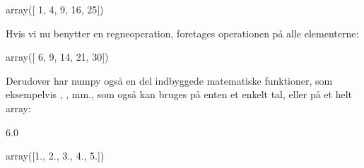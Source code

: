 \documentclass[letterpaper,10pt,english]{jupyterBook}
\begin{document}
\begin{sphinxVerbatim}[commandchars=\\\{\}]
  \PYG{p}{[}    \PYG{p}{]}
\end{sphinxVerbatim}

\begin{sphinxVerbatim}[commandchars=\\\{\}]
array([ 1,  4,  9, 16, 25])
\end{sphinxVerbatim}

Hvis vi nu benytter en regneoperation, foretages operationen på alle elementerne:

\begin{sphinxVerbatim}[commandchars=\\\{\}]
   
\end{sphinxVerbatim}

\begin{sphinxVerbatim}[commandchars=\\\{\}]
array([ 6,  9, 14, 21, 30])
\end{sphinxVerbatim}

Derudover har numpy også en del indbyggede matematiske funktioner, som eksempelvis , ,  mm., som også kan bruges på enten et enkelt tal, eller på et helt array:

\begin{sphinxVerbatim}[commandchars=\\\{\}]
\end{sphinxVerbatim}

\begin{sphinxVerbatim}[commandchars=\\\{\}]
6.0
\end{sphinxVerbatim}

\begin{sphinxVerbatim}[commandchars=\\\{\}]
\end{sphinxVerbatim}

\begin{sphinxVerbatim}[commandchars=\\\{\}]
array([1., 2., 3., 4., 5.])
\end{sphinxVerbatim}
\end{document}
